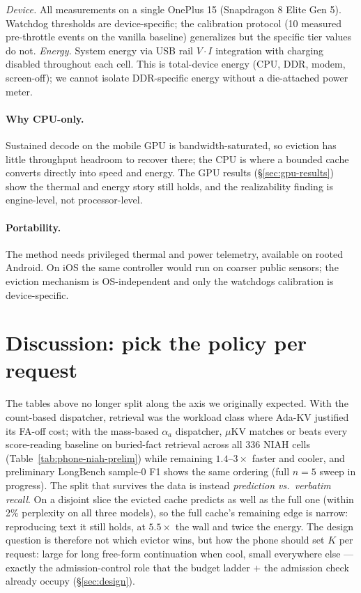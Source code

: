 \documentclass[sigconf, anonymous=false, screen=true]{acmart}
\begin{document}
\emph{Device.} All measurements on a single OnePlus 15 (Snapdragon 8 Elite Gen 5). Watchdog thresholds are device-specific; the calibration protocol (10 measured pre-throttle events on the vanilla baseline) generalizes but the specific tier values do not.
\emph{Energy.} System energy via USB rail $V\cdot I$ integration with charging disabled throughout each cell. This is total-device energy (CPU, DDR, modem, screen-off); we cannot isolate DDR-specific energy without a die-attached power meter.


\paragraph{Why CPU-only.} Sustained decode on the mobile GPU is bandwidth-saturated, so eviction has little throughput headroom to recover there; the CPU is where a bounded cache converts directly into speed and energy. The GPU results (\S\ref{sec:gpu-results}) show the thermal and energy story still holds, and the realizability finding is engine-level, not processor-level.
\paragraph{Portability.} The method needs privileged thermal and power telemetry, available on rooted Android. On iOS the same controller would run on coarser public sensors; the eviction mechanism is OS-independent and only the watchdog\textquotesingle s calibration is device-specific.
\section{Discussion: pick the policy per request}
\label{sec:discuss}

The tables above no longer split along the axis we originally expected. With the count-based dispatcher, retrieval was the workload class where Ada-KV justified its FA-off cost; with the mass-based $\alpha_a$ dispatcher, $\mu$KV matches or beats every score-reading baseline on buried-fact retrieval across all 336 NIAH cells (Table~\ref{tab:phone-niah-prelim}) while remaining $1.4$--$3\times$ faster and cooler, and preliminary LongBench sample-0 F1 shows the same ordering (full $n{=}5$ sweep in progress). The split that survives the data is instead \emph{prediction vs.\ verbatim recall}. On a disjoint slice the evicted cache predicts as well as the full one (within 2\% perplexity on all three models), so the full cache's remaining edge is narrow: reproducing text it still holds, at $5.5\times$ the wall and twice the energy. The design question is therefore not which evictor wins, but how the phone should set $K$ per request: large for long free-form continuation when cool, small everywhere else --- exactly the admission-control role that the budget ladder $+$ the admission check already occupy (\S\ref{sec:design}).
\end{document}
